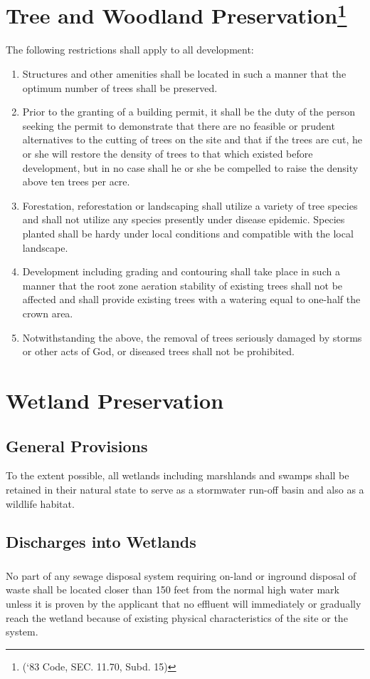\section{Tree and Woodland Preservation\footnote{(‘83 Code, SEC. 11.70, Subd. 15)}}
The following restrictions shall apply to all development:
\begin{enumerate}[{\indent}A)]
    \item Structures and other amenities shall be located in such a manner that the optimum number of trees shall be preserved.
    \item Prior to the granting of a building permit, it shall be the duty of the person seeking the permit to demonstrate that there are no feasible or prudent alternatives to the cutting of trees on the site and that if the trees are cut, he or she will restore the density of trees to that which existed before development, but in no case shall he or she be compelled to raise the density above ten trees per acre.
    \item Forestation, reforestation or landscaping shall utilize a variety of tree species and shall not utilize any species presently under disease epidemic. Species planted shall be hardy under local conditions and compatible with the local landscape.
    \item Development including grading and contouring shall take place in such a manner that the root zone aeration stability of existing trees shall not be affected and shall provide existing trees with a watering equal to one-half the crown area.
    \item Notwithstanding the above, the removal of trees seriously damaged by storms or other acts of God, or diseased trees shall not be prohibited.
\end{enumerate}
\section{Wetland Preservation}
\subsection{General Provisions}
To the extent possible, all wetlands including marshlands and swamps shall be retained in their natural state to serve as a stormwater run-off basin and also as a wildlife habitat.
\subsection{Discharges into Wetlands}
\subsubsection{}
No part of any sewage disposal system requiring on-land or inground disposal of waste shall be located closer than 150 feet from the normal high water mark unless it is proven by the applicant that no effluent will immediately or gradually reach the wetland because of existing physical characteristics of the site or the system.
